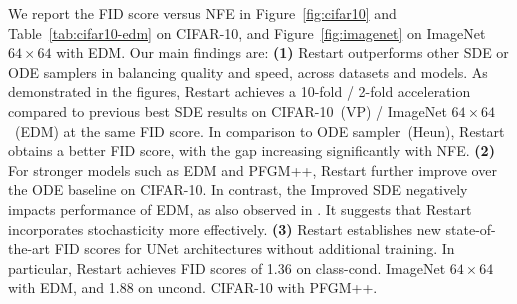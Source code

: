We report the FID score versus NFE in Figure~\ref{fig:cifar10} and Table~\ref{tab:cifar10-edm} on CIFAR-10, and Figure~\ref{fig:imagenet} on ImageNet $64\times 64$ with EDM. Our main findings are: \textbf{(1)} Restart outperforms other SDE or ODE samplers in balancing quality and speed, across datasets and models. As demonstrated in the figures, Restart achieves a 10-fold / 2-fold acceleration compared to previous best SDE results on CIFAR-10~(VP) / ImageNet $64\times 64$~(EDM) at the same FID score. In comparison to ODE sampler~(Heun), Restart obtains a better FID score, with the gap increasing significantly with NFE. \textbf{(2)} For stronger models such as EDM and PFGM++, Restart further improve over the ODE baseline on CIFAR-10. In contrast, the Improved SDE negatively impacts performance of EDM, as also observed in \cite{Karras2022ElucidatingTD}. It suggests that Restart incorporates stochasticity more effectively. \textbf{(3)} Restart establishes new state-of-the-art FID scores for UNet architectures without additional training. In particular, Restart achieves FID scores of 1.36 on class-cond. ImageNet $64\times 64$ with EDM, and 1.88 on uncond. CIFAR-10 with PFGM++.

